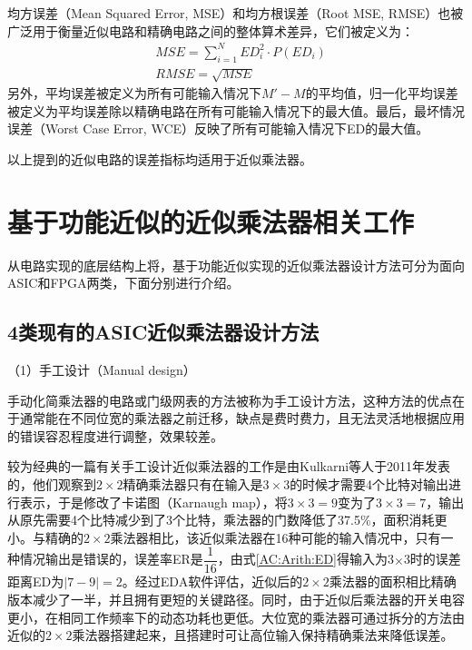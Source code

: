 均方误差（Mean Squared Error, MSE）和均方根误差（Root MSE, RMSE）也被广泛用于衡量近似电路和精确电路之间的整体算术差异，它们被定义为：
\begin{align}
    & MSE = \sum _{i=1}^{N}ED_{i}^{2}\cdot P(ED_{i}) \label{AC:Arith:MSE} \\
    & RMSE = \sqrt {MSE} \label{AC:Arith:RMSE}
\end{align}
另外，平均误差被定义为所有可能输入情况下$M \prime - M$的平均值，归一化平均误差被定义为平均误差除以精确电路在所有可能输入情况下的最大值。最后，最坏情况误差（Worst Case Error, WCE）反映了所有可能输入情况下ED的最大值。

以上提到的近似电路的误差指标均适用于近似乘法器。

\section{基于功能近似的近似乘法器相关工作}

从电路实现的底层结构上将，基于功能近似\cite{AC:ALS:survey}实现的近似乘法器设计方法可分为面向ASIC和FPGA两类，下面分别进行介绍。

\subsection{4类现有的ASIC近似乘法器设计方法}

（1）手工设计（Manual design）

手动化简乘法器的电路或门级网表的方法被称为手工设计方法，这种方法的优点在于通常能在不同位宽的乘法器之前迁移，缺点是费时费力，且无法灵活地根据应用的错误容忍程度进行调整，效果较差。

较为经典的一篇有关手工设计近似乘法器的工作是由Kulkarni等人\cite{AC:AM:KMap}于2011年发表的，他们观察到$2 \times 2$精确乘法器只有在输入是$3 \times 3$的时候才需要4个比特对输出进行表示，于是修改了卡诺图（Karnaugh map），将$3 \times 3 = 9$变为了$3 \times 3 = 7$，输出从原先需要4个比特减少到了3个比特，乘法器的门数降低了37.5\%，面积消耗更小。与精确的$2 \times 2$乘法器相比，该近似乘法器在16种可能的输入情况中，只有一种情况输出是错误的，误差率ER是$\dfrac{1}{16}$，由式\eqref{AC:Arith:ED}得输入为3$\times$3时的误差距离ED为$|7 − 9| = 2$。经过EDA软件评估，近似后的$2 \times 2$乘法器的面积相比精确版本减少了一半，并且拥有更短的关键路径。同时，由于近似后乘法器的开关电容更小，在相同工作频率下的动态功耗也更低。大位宽的乘法器可通过拆分的方法由近似的$2 \times 2$乘法器搭建起来，且搭建时可让高位输入保持精确乘法来降低误差。

